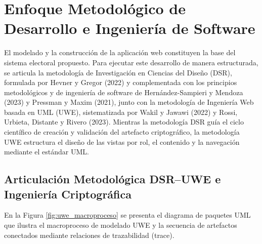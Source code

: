 \section{Enfoque Metodológico de Desarrollo e Ingeniería de Software}
\label{sec:metodologia_desarrollo}

El modelado y la construcción de la aplicación web constituyen la base del sistema electoral propuesto. Para ejecutar este desarrollo de manera estructurada, se articula la metodología de Investigación en Ciencias del Diseño (DSR), formulada por Hevner y Gregor (2022) y complementada con los principios metodológicos y de ingeniería de software de Hernández-Sampieri y Mendoza (2023) y Pressman y Maxim (2021), junto con la metodología de Ingeniería Web basada en UML (UWE), sistematizada por Wakil y Jawawi (2022) y Rossi, Urbieta, Distante y Rivero (2023). Mientras la metodología DSR guía el ciclo científico de creación y validación del artefacto criptográfico, la metodología UWE estructura el diseño de las vistas por rol, el contenido y la navegación mediante el estándar UML.

\subsection{Articulación Metodológica DSR--UWE e Ingeniería Criptográfica}
\label{subsec:articulacion_dsr_uwe}

En la Figura \ref{fig:uwe_macroproceso} se presenta el diagrama de paquetes UML que ilustra el macroproceso de modelado UWE y la secuencia de artefactos conectados mediante relaciones de trazabilidad (\guillemotleft trace\guillemotright).

